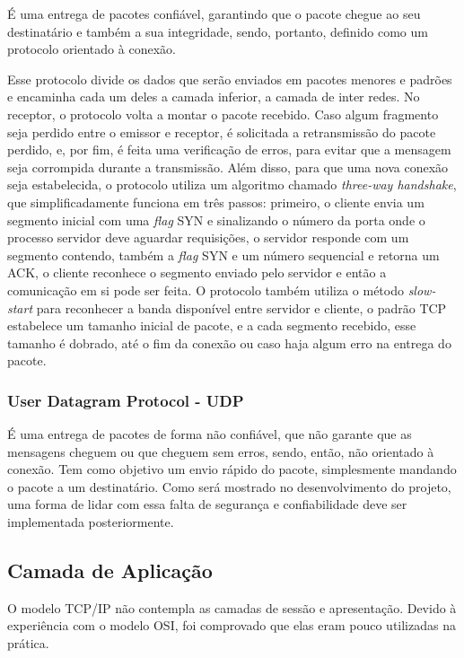 É uma entrega de pacotes confiável, garantindo que o pacote chegue ao seu destinatário e também a sua integridade, sendo, portanto, definido como um protocolo orientado à conexão.

Esse protocolo divide os dados que serão enviados em pacotes menores e padrões e encaminha cada um deles a camada inferior, a camada de inter redes. No receptor, o protocolo volta a montar o pacote recebido. Caso algum fragmento seja perdido entre o emissor e receptor, é solicitada a retransmissão do pacote perdido, e, por fim, é feita uma verificação de erros, para evitar que a mensagem seja corrompida durante a transmissão. Além disso, para que uma nova conexão seja estabelecida, o protocolo utiliza um algoritmo chamado \textit{three-way handshake}, que simplificadamente funciona em três passos: primeiro, o cliente envia um segmento inicial com uma \textit{flag} SYN e sinalizando o número da porta onde o processo servidor deve aguardar requisições, o servidor responde com um segmento contendo, também a \textit{flag} SYN e um número sequencial e retorna um ACK, o cliente reconhece o segmento enviado pelo servidor e então a comunicação em si pode ser feita. O protocolo também utiliza o método \textit{slow-start} para reconhecer a banda disponível entre servidor e cliente, o padrão TCP estabelece um tamanho inicial de pacote, e a cada segmento recebido, esse tamanho é dobrado, até o fim da conexão ou caso haja algum erro na entrega do pacote.

\subsubsection{User Datagram Protocol - UDP}

É uma entrega de pacotes de forma não confiável, que não garante que as mensagens cheguem ou que cheguem sem erros, sendo, então, não orientado à conexão. Tem como objetivo um envio rápido do pacote, simplesmente mandando o pacote a um destinatário. Como será mostrado no desenvolvimento do projeto, uma forma de lidar com essa falta de segurança e confiabilidade deve ser implementada posteriormente.

\subsection{Camada de Aplicação}

O modelo TCP/IP não contempla as camadas de sessão e apresentação. Devido à experiência com o modelo OSI, foi comprovado que elas eram pouco utilizadas na prática.

